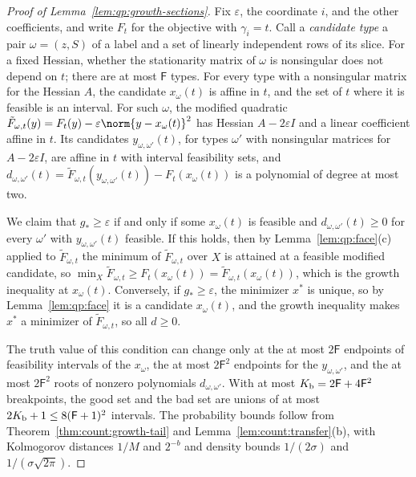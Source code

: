 \begin{proof}[Proof of Lemma~\ref{lem:qp:growth-sections}]
Fix $\varepsilon$, the coordinate $i$, and the other coefficients, and write
$F_t$ for the objective with $\gamma_i=t$. Call a \emph{candidate type} a pair
$\omega=(z,S)$ of a label and a set of linearly independent rows of its slice.
For a fixed Hessian, whether the stationarity matrix of $\omega$ is
nonsingular does not depend on $t$; there are at most $\mathsf F$ types. For
every type with a nonsingular matrix for the Hessian $A$, the candidate
$x_\omega(t)$ is affine in $t$, and the set of $t$ where it is feasible is an
interval. For such $\omega$, the modified quadratic
$\tilde F_{\omega,t}(y)=F_t(y)-\varepsilon\norm{y-x_\omega(t)}^2$ has Hessian
$A-2\varepsilon I$ and a linear coefficient affine in $t$. Its candidates
$y_{\omega,\omega'}(t)$, for types $\omega'$ with nonsingular matrices for
$A-2\varepsilon I$, are affine in $t$ with interval feasibility sets, and
$d_{\omega,\omega'}(t)=\tilde F_{\omega,t}(y_{\omega,\omega'}(t))-F_t(x_\omega(t))$
is a polynomial of degree at most two.

We claim that $g_*\ge\varepsilon$ if and only if some $x_\omega(t)$ is
feasible and $d_{\omega,\omega'}(t)\ge0$ for every $\omega'$ with
$y_{\omega,\omega'}(t)$ feasible. If this holds, then by
Lemma~\ref{lem:qp:face}(c) applied to $\tilde F_{\omega,t}$ the minimum of
$\tilde F_{\omega,t}$ over $X$ is attained at a feasible modified candidate, so
$\min_X\tilde F_{\omega,t}\ge F_t(x_\omega(t))=\tilde F_{\omega,t}(x_\omega(t))$,
which is the growth inequality at $x_\omega(t)$. Conversely, if
$g_*\ge\varepsilon$, the minimizer $x^*$ is unique, so by
Lemma~\ref{lem:qp:face} it is a candidate $x_\omega(t)$, and the growth
inequality makes $x^*$ a minimizer of $\tilde F_{\omega,t}$, so all $d\ge0$.

The truth value of this condition can change only at the at most $2\mathsf F$
endpoints of feasibility intervals of the $x_\omega$, the at most
$2\mathsf F^2$ endpoints for the $y_{\omega,\omega'}$, and the at most
$2\mathsf F^2$ roots of nonzero polynomials $d_{\omega,\omega'}$. With at most
$K_{\rm b}=2\mathsf F+4\mathsf F^2$ breakpoints, the good set and the bad set
are unions of at most $2K_{\rm b}+1\le8(\mathsf F+1)^2$ intervals. The
probability bounds follow from Theorem~\ref{thm:count:growth-tail} and
Lemma~\ref{lem:count:transfer}(b), with Kolmogorov distances $1/M$ and
$2^{-b}$ and density bounds $1/(2\sigma)$ and $1/(\sigma\sqrt{2\pi})$.
\end{proof}

